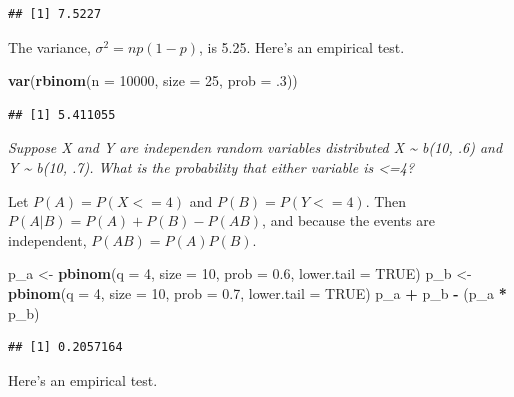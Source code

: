 \documentclass[]{book}
\newenvironment{Shaded}{\begin{snugshade}}{\end{snugshade}}
\newcommand{\DataTypeTok}[1]{\textcolor[rgb]{0.13,0.29,0.53}{#1}}
\newcommand{\DecValTok}[1]{\textcolor[rgb]{0.00,0.00,0.81}{#1}}
\newcommand{\FloatTok}[1]{\textcolor[rgb]{0.00,0.00,0.81}{#1}}
\newcommand{\KeywordTok}[1]{\textcolor[rgb]{0.13,0.29,0.53}{\textbf{#1}}}
\newcommand{\NormalTok}[1]{#1}
\newcommand{\OperatorTok}[1]{\textcolor[rgb]{0.81,0.36,0.00}{\textbf{#1}}}
\newcommand{\OtherTok}[1]{\textcolor[rgb]{0.56,0.35,0.01}{#1}}
\newcommand{\StringTok}[1]{\textcolor[rgb]{0.31,0.60,0.02}{#1}}
\begin{document}
\begin{verbatim}
## [1] 7.5227
\end{verbatim}

The variance, \(\sigma^2 = np (1 - p)\), is 5.25. Here's an empirical test.

\begin{Shaded}
\begin{Highlighting}[]
\KeywordTok{var}\NormalTok{(}\KeywordTok{rbinom}\NormalTok{(}\DataTypeTok{n =} \DecValTok{10000}\NormalTok{, }\DataTypeTok{size =} \DecValTok{25}\NormalTok{, }\DataTypeTok{prob =} \FloatTok{.3}\NormalTok{))}
\end{Highlighting}
\end{Shaded}

\begin{verbatim}
## [1] 5.411055
\end{verbatim}

\emph{Suppose X and Y are independen random variables distributed X \textasciitilde{} b(10, .6) and Y \textasciitilde{} b(10, .7). What is the probability that either variable is \textless=4?}

Let \(P(A) = P(X<=4)\) and \(P(B) = P(Y<=4)\). Then \(P(A|B) = P(A) + P(B) - P(AB)\), and because the events are independent, \(P(AB) = P(A)P(B)\).

\begin{Shaded}
\begin{Highlighting}[]
\NormalTok{p_a <-}\StringTok{ }\KeywordTok{pbinom}\NormalTok{(}\DataTypeTok{q =} \DecValTok{4}\NormalTok{, }\DataTypeTok{size =} \DecValTok{10}\NormalTok{, }\DataTypeTok{prob =} \FloatTok{0.6}\NormalTok{, }\DataTypeTok{lower.tail =} \OtherTok{TRUE}\NormalTok{)}
\NormalTok{p_b <-}\StringTok{ }\KeywordTok{pbinom}\NormalTok{(}\DataTypeTok{q =} \DecValTok{4}\NormalTok{, }\DataTypeTok{size =} \DecValTok{10}\NormalTok{, }\DataTypeTok{prob =} \FloatTok{0.7}\NormalTok{, }\DataTypeTok{lower.tail =} \OtherTok{TRUE}\NormalTok{)}
\NormalTok{p_a }\OperatorTok{+}\StringTok{ }\NormalTok{p_b }\OperatorTok{-}\StringTok{ }\NormalTok{(p_a }\OperatorTok{*}\StringTok{ }\NormalTok{p_b)}
\end{Highlighting}
\end{Shaded}

\begin{verbatim}
## [1] 0.2057164
\end{verbatim}

Here's an empirical test.
\end{document}
